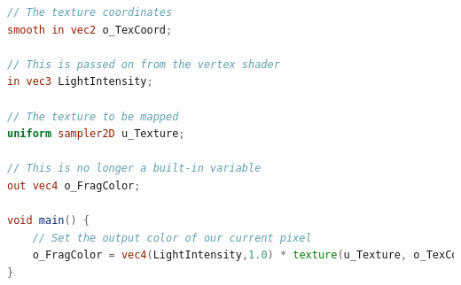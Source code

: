\documentclass[]{acmsiggraph}
\begin{document}
\begin{lstlisting}[language=GLSL, label={lst:glsl}, caption={A simple textured shader.}]
// The texture coordinates
smooth in vec2 o_TexCoord;

// This is passed on from the vertex shader
in vec3 LightIntensity;

// The texture to be mapped
uniform sampler2D u_Texture;

// This is no longer a built-in variable
out vec4 o_FragColor;

void main() {
    // Set the output color of our current pixel
    o_FragColor = vec4(LightIntensity,1.0) * texture(u_Texture, o_TexCoord);
}
\end{lstlisting}
\end{document}
